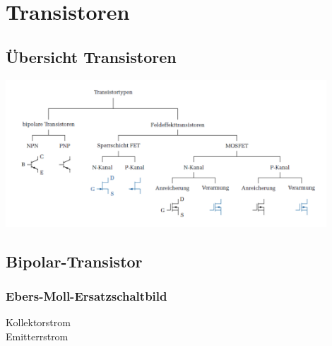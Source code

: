 \section{Transistoren}
\subsection{Übersicht Transistoren}
  \includegraphics[width=12cm]{./bilder/transistoren_uebersicht.png}
\subsection{Bipolar-Transistor}
  \subsubsection{Ebers-Moll-Ersatzschaltbild}
    \begin{minipage}[T]{16cm}
      Kollektorstrom
      \hspace{18.7mm}\\
      Emitterrstrom
      \hspace{19.7mm}\\
    \end{minipage}
    
